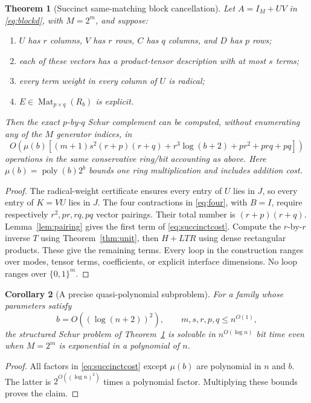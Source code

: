 \documentclass[11pt]{article}
\newtheorem{theorem}{Theorem}[section]
\newtheorem{corollary}[theorem]{Corollary}
\theoremstyle{definition}\newtheorem{definition}[theorem]{Definition}
\theoremstyle{remark}\newtheorem{remark}[theorem]{Remark}
\newcommand{\Mat}{\operatorname{Mat}}
\newcommand{\poly}{\operatorname{poly}}
\begin{document}
\begin{theorem}[Succinct same-matching block cancellation]\label{thm:succinct}
Let $A=I_M+UV$ in \eqref{eq:blockd}, with $M=2^m$, and suppose:
\begin{enumerate}[label=(\roman*),nosep]
\item $U$ has $r$ columns, $V$ has $r$ rows, $C$ has $q$ columns, and $D$ has $p$ rows;
\item each of these vectors has a product-tensor description with at most $s$ terms;
\item every term weight in every column of $U$ is radical;
\item $E\in\Mat_{p\times q}(R_b)$ is explicit.
\end{enumerate}
Then the exact $p$-by-$q$ Schur complement can be computed, without enumerating any of the $M$ generator indices, in
\begin{equation}\label{eq:succinctcost}
 O\!\left(\mu(b)\left[(m+1)s^2(r+p)(r+q)
 +r^3\log(b+2)+pr^2+prq+pq\right]\right)
\end{equation}
operations in the same conservative ring/bit accounting as above. Here $\mu(b)=\poly(b)2^b$ bounds one ring multiplication and includes addition cost.
\end{theorem}
\begin{proof}
The radical-weight certificate ensures every entry of $U$ lies in $J$, so every entry of $K=VU$ lies in $J$. The four contractions in \eqref{eq:four}, with $B=I$, require respectively $r^2,pr,rq,pq$ vector pairings. Their total number is $(r+p)(r+q)$. Lemma~\ref{lem:pairing} gives the first term of \eqref{eq:succinctcost}. Compute the $r$-by-$r$ inverse $T$ using Theorem~\ref{thm:unit}, then $H+LTR$ using dense rectangular products. These give the remaining terms. Every loop in the construction ranges over modes, tensor terms, coefficients, or explicit interface dimensions. No loop ranges over $\{0,1\}^m$.
\end{proof}

\begin{corollary}[A precise quasi-polynomial subproblem]\label{cor:qp}
For a family whose parameters satisfy
\[
 b=O((\log(n+2))^2),\qquad m,s,r,p,q\leq n^{O(1)},
\]
the structured Schur problem of Theorem~\ref{thm:succinct} is solvable in $n^{O(\log n)}$ bit time even when $M=2^m$ is exponential in a polynomial of $n$.
\end{corollary}
\begin{proof}
All factors in \eqref{eq:succinctcost} except $\mu(b)$ are polynomial in $n$ and $b$. The latter is $2^{O((\log n)^2)}$ times a polynomial factor. Multiplying these bounds proves the claim.
\end{proof}
\end{document}
